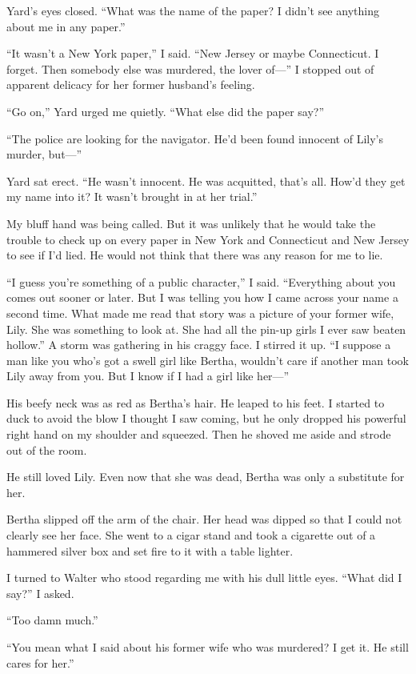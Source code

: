 {Yard’s eyes closed. “What was the name of the paper? I didn’t see anything about me in any paper.”

“It wasn’t a New York paper,” I said. “New Jersey or maybe Connecticut. I forget. Then somebody else was murdered, the lover of—” I stopped out of apparent delicacy for her former husband’s feeling.

“Go on,” Yard urged me quietly. “What else did the paper say?”

“The police are looking for the navigator. He’d been found innocent of Lily’s murder, but—”

Yard sat erect. “He wasn’t innocent. He was acquitted, that’s all. How’d they get my name into it? It wasn’t brought in at her trial.”

My bluff hand was being called. But it was unlikely that he would take the trouble to check up on every paper in New York and Connecticut and New Jersey to see if I’d lied. He would not think that there was any reason for me to lie.

“I guess you’re something of a public character,” I said. “Everything about you comes out sooner or later. But I was telling you how I came across your name a second time. What made me read that story was a picture of your former wife, Lily. She was something to look at. She had all the pin-up girls I ever saw beaten hollow.” A storm was gathering in his craggy face. I stirred it up. “I suppose a man like you who’s got a swell girl like Bertha, wouldn’t care if another man took Lily away from you. But I know if I had a girl like her—”

His beefy neck was as red as Bertha’s hair. He leaped to his feet. I started to duck to avoid the blow I thought I saw coming, but he only dropped his powerful right hand on my shoulder and squeezed. Then he shoved me aside and strode out of the room.

He still loved Lily. Even now that she was dead, Bertha was only a substitute for her.

Bertha slipped off the arm of the chair. Her head was dipped so that I could not clearly see her face. She went to a cigar stand and took a cigarette out of a hammered silver box and set fire to it with a table lighter.

I turned to Walter who stood regarding me with his dull little eyes. “What did I say?” I asked.

“Too damn much.”

“You mean what I said about his former wife who was murdered? I get it. He still cares for her.”

}
